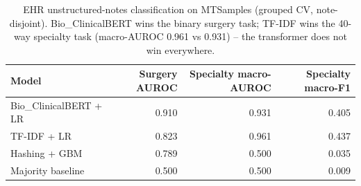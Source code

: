 \begin{table}[t]
\centering
\caption{EHR unstructured-notes classification on MTSamples (grouped CV, note-disjoint). Bio\_ClinicalBERT wins the binary surgery task; TF-IDF wins the 40-way specialty task (macro-AUROC 0.961 vs 0.931) -- the transformer does not win everywhere.}
\label{tab:ehr}
\begin{tabular}{lrrr}
\toprule
Model & Surgery AUROC & Specialty macro-AUROC & Specialty macro-F1 \\
\midrule
Bio\_ClinicalBERT + LR & 0.910 & 0.931 & 0.405 \\
TF-IDF + LR & 0.823 & 0.961 & 0.437 \\
Hashing + GBM & 0.789 & 0.500 & 0.035 \\
Majority baseline & 0.500 & 0.500 & 0.009 \\
\bottomrule
\end{tabular}
\end{table}
